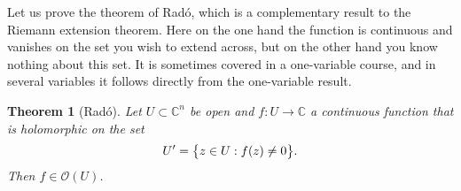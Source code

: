 \documentclass[12pt,openany]{book}
\newcommand{\avoidbreak}{\postdisplaypenalty=100}
\newcommand{\C}{{\mathbb{C}}}
\newcommand{\sO}{{\mathscr{O}}}
\theoremstyle{plain}
\newtheorem{thm}{Theorem}[section]
\theoremstyle{remark}
\theoremstyle{definition}
\theoremstyle{exercise}
\theoremstyle{example}
\begin{document}
Let us prove the theorem of
Rad\'o, which is a complementary result to the Riemann extension theorem.
Here on the one hand the function is
continuous and vanishes on the set you wish to extend across, but on the
other hand you know nothing about this set.
It is sometimes covered in a one-variable course,
and in several variables it follows directly from
the one-variable result.

\begin{thm}[Rad\'o] \label{thm:rado}
Let $U \subset \C^n$ be open and $f \colon U \to \C$ a continuous
function that is holomorphic on the set
\begin{equation*}
U' = \bigl\{ z \in U : f(z) \not= 0 \bigr\} .
\avoidbreak
\end{equation*}
Then $f \in \sO(U)$.
\end{thm}
\end{document}
